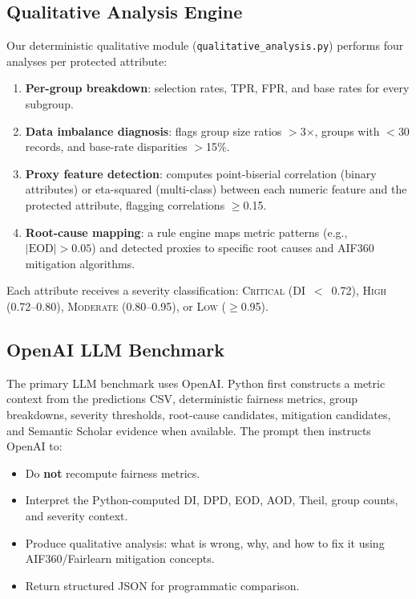 \documentclass[11pt,a4paper]{article}
\begin{document}
\subsection{Qualitative Analysis Engine}

Our deterministic qualitative module (\texttt{qualitative\_analysis.py})
performs four analyses per protected attribute:

\begin{enumerate}[nosep]
  \item \textbf{Per-group breakdown}: selection rates, TPR, FPR, and base
        rates for every subgroup.
  \item \textbf{Data imbalance diagnosis}: flags group size ratios
        $>$3$\times$, groups with $<$30 records, and base-rate disparities
        $>$15\%.
  \item \textbf{Proxy feature detection}: computes point-biserial
        correlation (binary attributes) or eta-squared (multi-class) between
        each numeric feature and the protected attribute, flagging
        correlations $\geq$0.15.
  \item \textbf{Root-cause mapping}: a rule engine maps metric patterns
        (e.g., $|\text{EOD}| > 0.05$) and detected proxies to specific root
        causes and AIF360 mitigation algorithms.
\end{enumerate}

Each attribute receives a severity classification: \textsc{Critical}
(DI~$<$~0.72), \textsc{High} (0.72--0.80), \textsc{Moderate} (0.80--0.95),
or \textsc{Low} ($\geq$0.95).

\subsection{OpenAI LLM Benchmark}

The primary LLM benchmark uses OpenAI. Python first constructs a metric
context from the predictions CSV, deterministic fairness metrics, group
breakdowns, severity thresholds, root-cause candidates, mitigation
candidates, and Semantic Scholar evidence when available. The prompt then
instructs OpenAI to:
\begin{itemize}[nosep]
  \item Do \textbf{not} recompute fairness metrics.
  \item Interpret the Python-computed DI, DPD, EOD, AOD, Theil, group counts,
        and severity context.
  \item Produce qualitative analysis: what is wrong, why, and how to fix it
        using AIF360/Fairlearn mitigation concepts.
  \item Return structured JSON for programmatic comparison.
\end{itemize}
\end{document}
